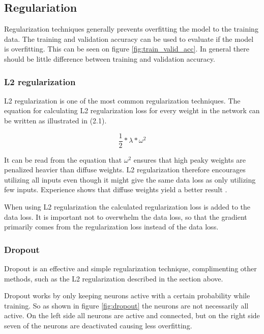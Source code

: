\subsection{Regulariation}
Regularization techniques generally prevents overfitting the model to the training data. The training and validation accuracy can be used to evaluate if the model is overfitting. This can be seen on figure \ref{fig:train_valid_acc}. In general there should be little difference between training and validation accuracy.



\subsubsection{L2 regularization}
L2 regularization is one of the most common regularization techniques. The equation for calculating L2 regularization loss for every weight in the network can be written as illustrated in (2.1). 

\begin{equation}
\dfrac{1}{2} * \lambda * \omega^2
\end{equation}

It can be read from the equation that $\omega^2$ ensures that high peaky weights are penalized heavier than diffuse weights. L2 regularization therefore encourages utilizing all inputs even though it might give the same data loss as only utilizing few inputs. Experience shows that diffuse weights yield a better result \citep{LC_cs231n}.

When using L2 regularization the calculated regularization loss is added to the data loss. It is important not to overwhelm the data loss, so that the gradient primarily comes from the regularization loss instead of the data loss. 


\subsubsection{Dropout}
Dropout is an effective and simple regularization technique, complimenting other methods, such as the L2 regularization described in the section above. 

Dropout works by only keeping neurons active with a certain probability while training. So as shown in figure \ref{fig:dropout} the neurons are not necessarily all active. On the left side all neurons are active and connected, but on the right side seven of the neurons are deactivated causing less overfitting.  

